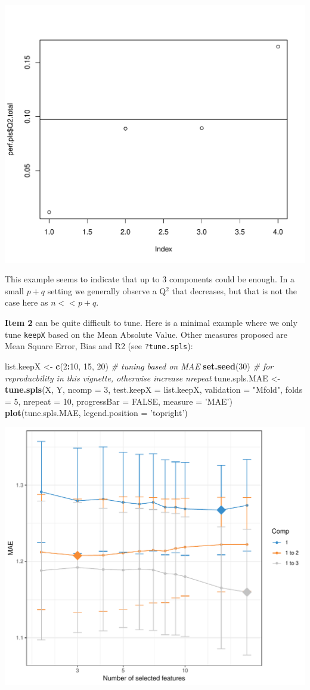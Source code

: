 \documentclass[]{book}
\newenvironment{Shaded}{\begin{snugshade}}{\end{snugshade}}
\newcommand{\CommentTok}[1]{\textcolor[rgb]{0.56,0.35,0.01}{\textit{#1}}}
\newcommand{\DataTypeTok}[1]{\textcolor[rgb]{0.13,0.29,0.53}{#1}}
\newcommand{\DecValTok}[1]{\textcolor[rgb]{0.00,0.00,0.81}{#1}}
\newcommand{\KeywordTok}[1]{\textcolor[rgb]{0.13,0.29,0.53}{\textbf{#1}}}
\newcommand{\NormalTok}[1]{#1}
\newcommand{\OperatorTok}[1]{\textcolor[rgb]{0.81,0.36,0.00}{\textbf{#1}}}
\newcommand{\OtherTok}[1]{\textcolor[rgb]{0.56,0.35,0.01}{#1}}
\newcommand{\StringTok}[1]{\textcolor[rgb]{0.31,0.60,0.02}{#1}}
\begin{document}
\begin{center}\includegraphics[width=0.5\linewidth,]{Figures/05-pls-perf-1} \end{center}

This example seems to indicate that up to 3 components could be enough. In a small \(p+q\) setting we generally observe a Q\(^2\) that decreases, but that is not the case here as \(n << p+q\).

\textbf{Item 2} can be quite difficult to tune. Here is a minimal example where we only tune \texttt{keepX} based on the Mean Absolute Value. Other measures proposed are Mean Square Error, Bias and R2 (see \texttt{?tune.spls}):

\begin{Shaded}
\begin{Highlighting}[]
\NormalTok{list.keepX <-}\StringTok{ }\KeywordTok{c}\NormalTok{(}\DecValTok{2}\OperatorTok{:}\DecValTok{10}\NormalTok{, }\DecValTok{15}\NormalTok{, }\DecValTok{20}\NormalTok{)}
\CommentTok{# tuning based on MAE}
\KeywordTok{set.seed}\NormalTok{(}\DecValTok{30}\NormalTok{) }\CommentTok{# for reproducbility in this vignette, otherwise increase nrepeat}
\NormalTok{tune.spls.MAE <-}\StringTok{ }\KeywordTok{tune.spls}\NormalTok{(X, Y, }\DataTypeTok{ncomp =} \DecValTok{3}\NormalTok{,}
                           \DataTypeTok{test.keepX =}\NormalTok{ list.keepX,}
                           \DataTypeTok{validation =} \StringTok{"Mfold"}\NormalTok{, }\DataTypeTok{folds =} \DecValTok{5}\NormalTok{,}
                           \DataTypeTok{nrepeat =} \DecValTok{10}\NormalTok{, }\DataTypeTok{progressBar =} \OtherTok{FALSE}\NormalTok{,}
                           \DataTypeTok{measure =} \StringTok{'MAE'}\NormalTok{)}
\KeywordTok{plot}\NormalTok{(tune.spls.MAE, }\DataTypeTok{legend.position =} \StringTok{'topright'}\NormalTok{)}
\end{Highlighting}
\end{Shaded}

\begin{center}\includegraphics[width=0.5\linewidth,]{Figures/05-pls-tune-1} \end{center}
\end{document}
